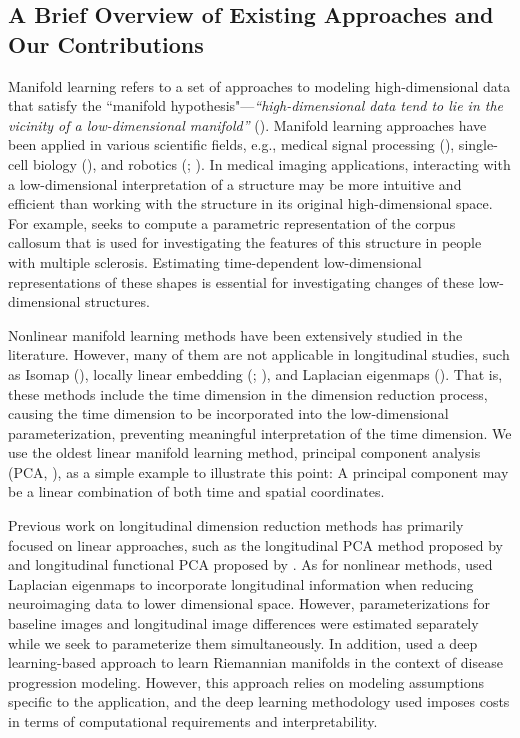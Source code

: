 \documentclass[12pt]{article}
\theoremstyle{definition}
\begin{document}
\subsection{A Brief Overview of Existing Approaches and Our Contributions}

Manifold learning refers to a set of approaches to modeling high-dimensional data that satisfy the ``manifold hypothesis"---\textit{``high-dimensional data tend to lie in the vicinity of a low-dimensional manifold''} (\cite{fefferman2016testing}). Manifold learning approaches have been applied in various scientific fields, e.g., medical signal processing (\cite{shen2022robust}), single-cell biology (\cite{ding2023learning}), and robotics (\cite{gao2023k}; \cite{gao2024bi}). In medical imaging applications, interacting with a low-dimensional interpretation of a structure may be more intuitive and efficient than working with the structure in its original high-dimensional space. For example, \cite{yueParameterizationWhiteMatter2016} seeks to compute a parametric representation of the corpus callosum that is used for investigating the features of this structure in people with multiple sclerosis. Estimating time-dependent low-dimensional representations of these shapes is essential for investigating changes of these low-dimensional structures. 

Nonlinear manifold learning methods have been extensively studied in the literature. However, many of them are not applicable in longitudinal studies, such as Isomap (\cite{tenenbaumGlobalGeometricFramework2000}), locally linear embedding (\cite{roweisNonlinearDimensionalityReduction2000}; \cite{wu2018think}), and Laplacian eigenmaps (\cite{belkin2003laplacian}). That is, these methods include the time dimension in the dimension reduction process, causing the time dimension to be incorporated into the low-dimensional parameterization, preventing meaningful interpretation of the time dimension. We use the oldest linear manifold learning method, principal component analysis (PCA, \cite{Pearson1901on}), as a simple example to illustrate this point: A principal component may be a linear combination of both time and spatial coordinates.

Previous work on longitudinal dimension reduction methods has primarily focused on linear approaches, such as the longitudinal PCA method proposed by \cite{kinsonLongitudinalPrincipalComponent2020} and longitudinal functional PCA proposed by \cite{greven2011longitudinal}. As for nonlinear methods, \cite{wolzManifoldLearningBiomarker2010} used Laplacian eigenmaps to incorporate longitudinal information when reducing neuroimaging data to lower dimensional space. However, parameterizations for baseline images and longitudinal image differences were estimated separately while we seek to parameterize them simultaneously. In addition, \cite{louisRiemannianGeometryLearning2019} used a deep learning-based approach to learn Riemannian manifolds in the context of disease progression modeling. However, this approach relies on modeling assumptions specific to the application, and the deep learning methodology used imposes costs in terms of computational requirements and interpretability. 
\end{document}
